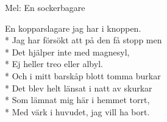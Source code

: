 \begin{SongText}[Kopparslagaren]
    \begin{SongInfo}
        Mel: En sockerbagare
    \end{SongInfo}
    \begin{SongVerse}
        En kopparslagare jag har i knoppen.\\*%
        Jag har försökt att på den få stopp men\\*%
        Det hjälper inte med magnesyl,\\*%
        Ej heller treo eller albyl.\\*%
        Och i mitt barskåp blott tomma burkar\\*%
        Det blev helt länsat i natt av skurkar\\*%
        Som lämnat mig här i hemmet torrt,\\*%
        Med värk i huvudet, jag vill ha bort.
    \end{SongVerse}
\end{SongText}
